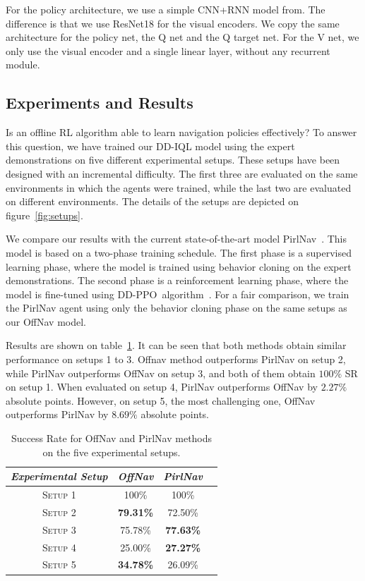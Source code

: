 For the policy architecture, we use a simple CNN+RNN model from\cite{ramrakhya2023}.
The difference is that we use ResNet18 for the visual encoders.
We copy the same architecture for the policy net, the Q net and the Q target net.
For the V net, we only use the visual encoder and a single linear layer, without any recurrent module.

\subsection{Experiments and Results}\label{subsec:experiments_offnav}

Is an offline RL algorithm able to learn navigation policies effectively?
To answer this question, we have trained our DD-IQL model using the expert demonstrations on five different experimental setups.
These setups have been designed with an incremental difficulty.
The first three are evaluated on the same environments in which the agents were trained, while the last two are evaluated on different environments.
The details of the setups are depicted on figure~\ref{fig:setups}.

We compare our results with the current state-of-the-art model PirlNav~\cite{ramrakhya2023}.
This model is based on a two-phase training schedule.
The first phase is a supervised learning phase, where the model is trained using behavior cloning on the expert demonstrations.
The second phase is a reinforcement learning phase, where the model is fine-tuned using DD-PPO~algorithm~\cite{wijmans2020}.
For a fair comparison, we train the PirlNav agent using only the behavior cloning phase on the same setups as our OffNav model.

Results are shown on table~\ref{tab:success}.
It can be seen that both methods obtain similar performance on setups 1 to 3.
Offnav method outperforms PirlNav on setup 2, while PirlNav outperforms OffNav on setup 3, and both of them obtain $100\%$ SR on setup 1.
When evaluated on setup 4, PirlNav outperforms OffNav by $2.27\%$ absolute points.
However, on setup 5, the most challenging one, OffNav outperforms PirlNav by $8.69\%$ absolute points.


\begin{table}
    \centering
    \begin{tabular}{c|ccc}
        \toprule
        \textit{Experimental Setup} & \textit{OffNav}  & \textit{PirlNav} \\
        \midrule
        \textsc{Setup 1}            & 100\%          & 100\%   \\
        \textsc{Setup 2}            & \textbf{79.31\%} & 72.50\%          \\
        \textsc{Setup 3}            & 75.78\%          & \textbf{77.63\%} \\
        \textsc{Setup 4}            & 25.00\%          & \textbf{27.27\%} \\
        \textsc{Setup 5}            & \textbf{34.78\%} & 26.09\%          \\
        \bottomrule
    \end{tabular}
    \caption{Success Rate for OffNav and PirlNav methods on the five experimental setups.}
    \label{tab:success}
\end{table}

